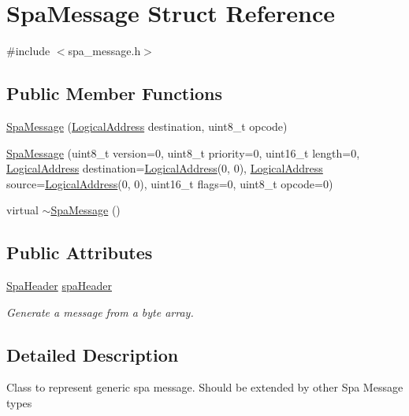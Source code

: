 \hypertarget{structSpaMessage}{}\section{Spa\+Message Struct Reference}
\label{structSpaMessage}


{\ttfamily \#include $<$spa\+\_\+message.\+h$>$}

\subsection*{Public Member Functions}
\begin{DoxyCompactItemize}
\item 
\hyperlink{structSpaMessage_ac3106c80ebd5c60d0e939c76f77ef0cd}{Spa\+Message} (\hyperlink{structLogicalAddress}{Logical\+Address} destination, uint8\+\_\+t opcode)
\item 
\hyperlink{structSpaMessage_ade633a9b5780d7d361493d30aaa227ff}{Spa\+Message} (uint8\+\_\+t version=0, uint8\+\_\+t priority=0, uint16\+\_\+t length=0, \hyperlink{structLogicalAddress}{Logical\+Address} destination=\hyperlink{structLogicalAddress}{Logical\+Address}(0, 0), \hyperlink{structLogicalAddress}{Logical\+Address} source=\hyperlink{structLogicalAddress}{Logical\+Address}(0, 0), uint16\+\_\+t flags=0, uint8\+\_\+t opcode=0)
\item 
virtual \hyperlink{structSpaMessage_ae7e9d8266f10dc46d96b913671fd5ed1}{$\sim$\+Spa\+Message} ()
\end{DoxyCompactItemize}
\subsection*{Public Attributes}
\begin{DoxyCompactItemize}
\item 
\hyperlink{structSpaHeader}{Spa\+Header} \hyperlink{structSpaMessage_af7925bcb1a497c244202963fc5a9c8d6}{spa\+Header}
\begin{DoxyCompactList}\small\item\em Generate a message from a byte array. \end{DoxyCompactList}\end{DoxyCompactItemize}


\subsection{Detailed Description}
Class to represent generic spa message. Should be extended by other Spa Message types 

